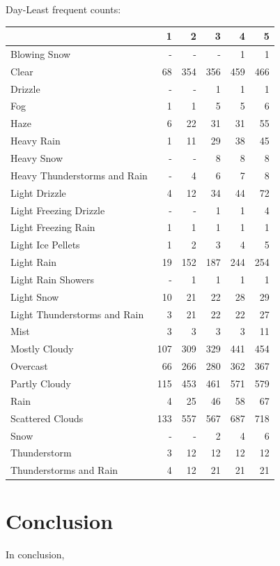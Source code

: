 \documentclass[11pt]{scrartcl}
\begin{document}
Day-Least frequent counts:
\begin{tabular}{lrrrrr}
\toprule
{} &    1 &    2 &    3 &    4 &    5 \\
\midrule
Blowing Snow                 &  - &  - &  - &    1 &    1 \\
Clear                        &   68 &  354 &  356 &  459 &  466 \\
Drizzle                      &  - &  - &    1 &    1 &    1 \\
Fog                          &    1 &    1 &    5 &    5 &    6 \\
Haze                         &    6 &   22 &   31 &   31 &   55 \\
Heavy Rain                   &    1 &   11 &   29 &   38 &   45 \\
Heavy Snow                   &  - &  - &    8 &    8 &    8 \\
Heavy Thunderstorms and Rain &  - &    4 &    6 &    7 &    8 \\
Light Drizzle                &    4 &   12 &   34 &   44 &   72 \\
Light Freezing Drizzle       &  - &  - &    1 &    1 &    4 \\
Light Freezing Rain          &    1 &    1 &    1 &    1 &    1 \\
Light Ice Pellets            &    1 &    2 &    3 &    4 &    5 \\
Light Rain                   &   19 &  152 &  187 &  244 &  254 \\
Light Rain Showers           &  - &    1 &    1 &    1 &    1 \\
Light Snow                   &   10 &   21 &   22 &   28 &   29 \\
Light Thunderstorms and Rain &    3 &   21 &   22 &   22 &   27 \\
Mist                         &    3 &    3 &    3 &    3 &   11 \\
Mostly Cloudy                &  107 &  309 &  329 &  441 &  454 \\
Overcast                     &   66 &  266 &  280 &  362 &  367 \\
Partly Cloudy                &  115 &  453 &  461 &  571 &  579 \\
Rain                         &    4 &   25 &   46 &   58 &   67 \\
Scattered Clouds             &  133 &  557 &  567 &  687 &  718 \\
Snow                         &  - &  - &    2 &    4 &    6 \\
Thunderstorm                 &    3 &   12 &   12 &   12 &   12 \\
Thunderstorms and Rain       &    4 &   12 &   21 &   21 &   21 \\
\bottomrule
\end{tabular}
\section*{Conclusion}
In conclusion,


\end{document}
